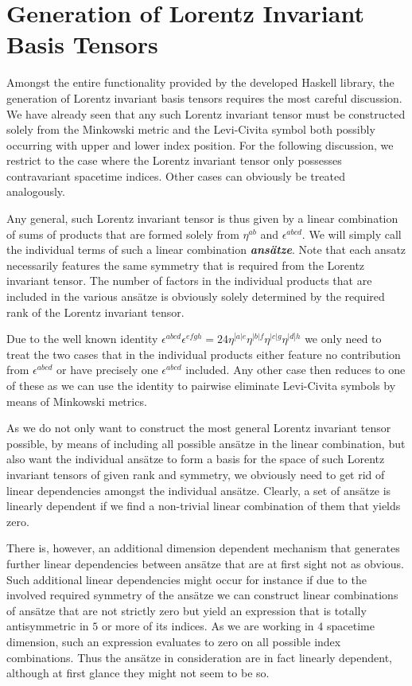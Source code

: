\section{Generation of Lorentz Invariant Basis Tensors}\label{LorentzGen}
Amongst the entire functionality provided by the developed Haskell library, the generation of Lorentz invariant basis tensors requires the most careful discussion. We have already seen that any such Lorentz invariant tensor must be constructed solely from the Minkowski metric and the Levi-Civita symbol both possibly occurring with upper and lower index position. For the following discussion, we restrict to the case where the Lorentz invariant tensor only possesses contravariant spacetime indices. Other cases can obviously be treated analogously.

Any general, such Lorentz invariant tensor is thus given by a linear combination of sums of products that are formed solely from $\eta^{ab}$ and $\epsilon^{abcd}$.
We will simply call the individual terms of such a linear combination \textit{\textbf{ansätze}}. Note that each ansatz necessarily features the same symmetry that is required from the Lorentz invariant tensor. The number of factors in the individual products that are included in the various ansätze is obviously solely determined by the required rank of the Lorentz invariant tensor.

Due to the well known identity $\epsilon^{abcd}\epsilon^{efgh} = 24 \eta^{[a\vert e}\eta^{\vert b \vert f}\eta^{\vert c \vert g}\eta^{\vert d] h}$ we only need to treat the two cases that in the individual products either feature  no contribution from $\epsilon^{abcd}$ or have precisely one $\epsilon^{abcd}$ included. Any other case then reduces to one of these as we can use the identity to pairwise eliminate Levi-Civita symbols by means of Minkowski metrics. 

As we do not only want to construct the most general Lorentz invariant tensor possible, by means of including all possible ansätze in the linear combination, but also want the individual ansätze to form a basis for the space of such Lorentz invariant tensors of given rank and symmetry, we obviously need to get rid of linear dependencies amongst the individual ansätze. Clearly, a set of ansätze is linearly dependent if we find a non-trivial linear combination of them that yields zero. 

There is, however, an additional dimension dependent mechanism that generates further linear dependencies between ansätze that are at first sight not as obvious. Such additional linear dependencies might occur for instance if due to the involved required symmetry of the ansätze we can construct linear combinations of ansätze that are not strictly zero but yield an expression that is totally antisymmetric in $5$ or more of its indices. As we are working in $4$ spacetime dimension, such an expression evaluates to zero on all possible index combinations. Thus the ansätze in consideration are in fact linearly dependent, although at first glance they might not seem to be so. 

